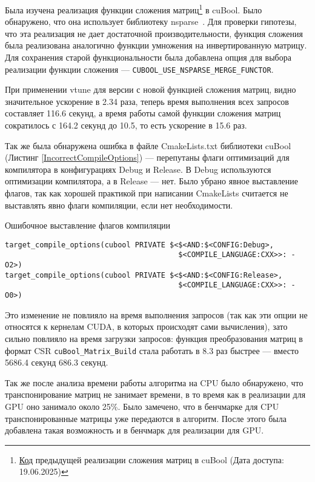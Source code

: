Была изучена реализация функции сложения матриц\footnote{\href{https://github.com/SparseLinearAlgebra/cuBool/blob/ab425e17000af8763e7b2cdf020589f8b2db371d/cubool/sources/cuda/kernels/spmerge.cuh#L36}{Код} предыдущей реализации сложения матриц в cuBool (Дата доступа: 19.06.2025)} в cuBool. Было обнаружено, что она использует библиотеку nsparse~\cite{Nsparse}. Для проверки гипотезы, что эта реализация не дает достаточной производительности, функция сложения была реализована аналогично функции умножения на инвертированную матрицу. Для сохранения старой функциональности была добавлена опция для выбора реализации функции сложения --- \verb|CUBOOL_USE_NSPARSE_MERGE_FUNCTOR|.

При применении vtune для версии с новой функцией сложения матриц, видно значительное ускорение в 2.34 раза, теперь время выполнения всех запросов составляет 116.6 секунд, а время работы самой функции сложения матриц сократилось с 164.2 секунд до 10.5, то есть ускорение в 15.6 раз.

Так же была обнаружена ошибка в файле CmakeLists.txt библиотеки cuBool (Листинг \ref{IncorrectCompileOptions}) --- перепутаны флаги оптимизаций для компилятора в конфигурациях Debug и Release. В Debug используются оптимизации компилятора, а в Release --- нет. Было убрано явное выставление флагов, так как хорошей практикой при написании CmakeLists считается не выставлять явно флаги компиляции, если нет необходимости.

\begin{listing}
    \caption{Ошибочное выставление флагов компиляции}
    \begin{verbatim}
target_compile_options(cubool PRIVATE $<$<AND:$<CONFIG:Debug>,
                                        $<COMPILE_LANGUAGE:CXX>>: -O2>)
target_compile_options(cubool PRIVATE $<$<AND:$<CONFIG:Release>,
                                        $<COMPILE_LANGUAGE:CXX>>: -O0>)
  \end{verbatim}
\label{IncorrectCompileOptions}
\end{listing}


Это изменение не повлияло на время выполнения запросов (так как эти опции не относятся к кернелам CUDA, в которых происходят сами вычисления), зато сильно повлияло на время загрузки запросов: функция преобразования матриц в формат CSR \verb|cuBool_Matrix_Build| стала работать в 8.3 раз быстрее --- вместо 5686.4 секунд 686.3 секунд.

Так же после анализа времени работы алгоритма на CPU было обнаружено, что транспонирование матриц не занимает времени, в то время как в реализации для GPU оно занимало около 25\%. Было замечено, что в бенчмарке для CPU транспонированные матрицы уже передаются в алгоритм. После этого была добавлена такая возможность и в бенчмарк для реализации для GPU.

